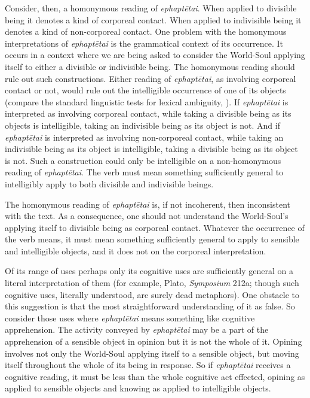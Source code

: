 Consider, then, a homonymous reading of \emph{ephaptētai}. When applied to divisible being it denotes a kind of corporeal contact. When applied to indivisible being it denotes a kind of non-corporeal contact. One problem with the homonymous interpretations of \emph{ephaptētai} is the grammatical context of its occurrence. It occurs in a context where we are being asked to consider the World-Soul applying itself to either a divisible or indivisible being. The homonymous reading should rule out such constructions. Either reading of \emph{ephaptētai}, as involving corporeal contact or not, would rule out the intelligible occurrence of one of its objects  (compare the standard linguistic tests for lexical ambiguity, \citealt{Zwicky:1975hl}). If \emph{ephaptētai} is interpreted as involving corporeal contact, while taking a divisible being as its objects is intelligible, taking an indivisible being as its object is not. And if \emph{ephaptētai} is interpreted as involving non-corporeal contact, while taking an indivisible being as its object is intelligible, taking a divisible being as its object is not. Such a construction could only be intelligible on a non-homonymous reading of \emph{ephaptētai}. The verb must mean something sufficiently general to intelligibly apply to both divisible and indivisible beings.

The homonymous reading of \emph{ephaptētai} is, if not incoherent, then inconsistent with the text. As a consequence, one should not understand the World-Soul's applying itself to divisible being as corporeal contact. Whatever the occurrence of the verb means, it must mean something sufficiently general to apply to sensible and intelligible objects, and it does not on the corporeal interpretation. 

Of its range of uses perhaps only its cognitive uses are sufficiently general on a literal interpretation of them (for example, Plato, \emph{Symposium} 212a; though such cognitive uses, literally understood, are surely dead metaphors). One obstacle to this suggestion is that the most straightforward understanding of it as false. So consider those uses where \emph{ephaptētai} means something like cognitive apprehension. The activity conveyed by \emph{ephaptētai} may be a part of the apprehension of a sensible object in opinion but it is not the whole of it. Opining involves not only the World-Soul applying itself to a sensible object, but moving itself throughout the whole of its being in response. So if \emph{ephaptētai} receives a cognitive reading, it must be less than the whole cognitive act effected, opining as applied to sensible objects and knowing as applied to intelligible objects. 

